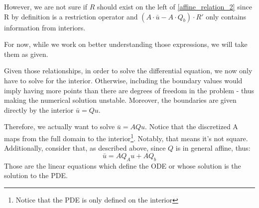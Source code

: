 \documentclass[11pt]{article}
\begin{document}
\begin{itemize}
			However, we are not sure if $R$ should exist on the left of \eqref{affine_relation_2} since R by definition is a restriction operator and $(A \cdot \bar{u}-A \cdot Q_b)\cdot R'$ only contains information from interiors.
			\iffalse %
			Also the size of the LHS of \eqref{affine_relation_2} is $K\times \bar{K}$, but the size of the RHS is $\bar{I}\times I$ .
			\fi
			For now, while we work on better understanding those expressions, we will take them as given.


			Given those relationships, in order to solve the differential equation, we now only have to solve for the interior. Otherwise, including the boundary values would imply having more points than there are degrees of freedom in the problem - thus making the numerical solution unstable. Moreover, the boundaries are given directly by the interior $\bar{u} = Q u$.

			Therefore, we actually want to solve $\bar{u} = A Q u$. Notice that the discretized A maps from the full domain to the interior\footnote{Notice that the PDE is only defined on the interior}. Notably, that means it's not square. Additionally, consider that, as described above, since $Q$ is in general affine, thus:
			\begin{equation}
			\bar{u} = A Q_A u + A Q_b
			\end{equation}
			Those are the linear equations which define the ODE or whose solution is the solution to the PDE.
		\end{itemize}
\end{document}
